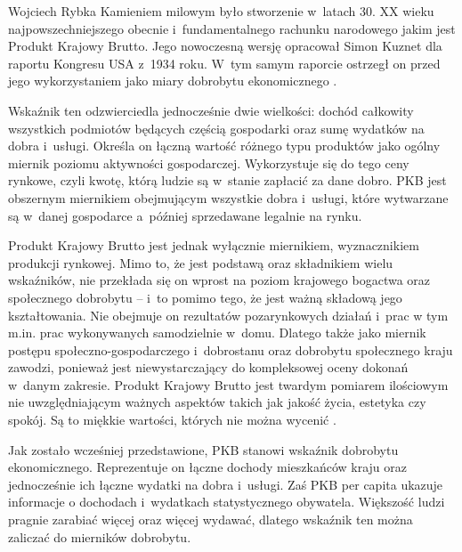 \begin{artplenv}{Wojciech Rybka}
Kamieniem milowym było stworzenie w~latach 30. XX wieku najpowszechniejszego obecnie i~fundamentalnego rachunku
narodowego jakim jest Produkt Krajowy Brutto. Jego nowoczesną wersję opracował Simon Kuznet dla raportu Kongresu
USA z~1934 roku. W~tym samym raporcie ostrzegł on przed jego wykorzystaniem jako miary dobrobytu ekonomicznego
\parencite{dickinson_gdp:_2011}.

Wskaźnik ten odzwierciedla jednocześnie dwie wielkości: dochód całkowity wszystkich podmiotów będących częścią
gospodarki oraz sumę wydatków na dobra i~usługi. Określa on łączną wartość różnego typu produktów jako ogólny miernik
poziomu aktywności gospodarczej. Wykorzystuje się do tego ceny rynkowe, czyli kwotę, którą ludzie są w~stanie zapłacić
za dane dobro. PKB jest obszernym miernikiem obejmującym wszystkie dobra i~usługi, które wytwarzane są w~danej
gospodarce a~później sprzedawane legalnie na rynku.

Produkt Krajowy Brutto jest jednak wyłącznie miernikiem, wyznacznikiem produkcji rynkowej. Mimo to, że jest podstawą
oraz składnikiem wielu wskaźników, nie przekłada się on wprost na poziom krajowego bogactwa oraz społecznego
dobrobytu -- i~to pomimo tego, że jest ważną składową jego kształtowania. Nie obejmuje on rezultatów pozarynkowych działań i~prac
w tym m.in. prac wykonywanych samodzielnie w~domu. Dlatego także jako miernik postępu
społeczno-gospodarczego i~dobrostanu oraz dobrobytu społecznego kraju zawodzi, ponieważ
jest niewystarczający do kompleksowej oceny dokonań w~danym zakresie.
Produkt Krajowy Brutto jest twardym pomiarem ilościowym nie uwzględniającym ważnych aspektów takich jak
jakość życia, estetyka czy spokój. Są to miękkie wartości, których nie można wycenić
\parencite{dickinson_gdp:_2011}.

Jak zostało wcześniej przedstawione, PKB stanowi wskaźnik dobrobytu ekonomicznego. Reprezentuje on łączne dochody
mieszkańców kraju oraz jednocześnie ich łączne wydatki na dobra i~usługi. Zaś PKB per capita ukazuje informacje o
dochodach i~wydatkach statystycznego obywatela. Większość ludzi pragnie zarabiać więcej oraz więcej wydawać, dlatego
wskaźnik ten można zaliczać do mierników dobrobytu.


\end{artplenv}
